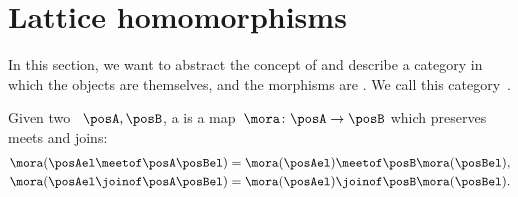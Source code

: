 \section{Lattice homomorphisms}
In this section, we want to abstract the concept of  and describe a category in which the objects are  themselves, and the morphisms are .
We call this category~\Lat.

\begin{ctdefinition}
    \label{def:lattice-homomorphism}
    Given two ~$\posA, \posB$, a  is a map~$\mora\colon \posA\to \posB$ which preserves meets and joins:
    \begin{equation}
        \begin{aligned}
            \mora(\posAel \meetof\posA \posBel) & = \mora(\posAel) \meetof\posB \mora(\posBel), \\
            \mora(\posAel \joinof\posA \posBel) & = \mora(\posAel) \joinof\posB \mora(\posBel).
        \end{aligned}
    \end{equation}
\end{ctdefinition}

